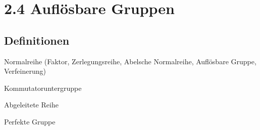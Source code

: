 \documentclass[twocolumn]{report}
\begin{document}
\section*{2.4 Auflösbare Gruppen}
\subsection*{Definitionen}
\begin{enumerate*}[label=2.\arabic*, itemsep=0pt, topsep=0pt, parsep=0pt, partopsep=0pt, leftmargin=*]
    \item Normalreihe (Faktor, Zerlegungsreihe, Abelsche Normalreihe, Auflösbare Gruppe, Verfeinerung)
    \item Kommutatoruntergruppe
    \item Abgeleitete Reihe
    \item Perfekte Gruppe
\end{enumerate*}
\end{document}
